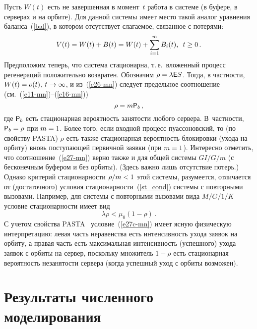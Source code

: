 \begin{multicols}{2}
\noindent
Пусть    $W(t)$
 есть не завершенная  в момент~$t$ работа в системе (в буфере, в серверах  и на
 орбите). Для данной  сис\-те\-мы имеет место такой аналог уравнения баланса~(\ref{bal}), 
 в котором отсутствует слагаемое, связанное с потерями:
\begin{equation}
V(t)=W(t)+B(t)=W(t)+\sum\limits_{i=1}^mB_i(t),\enskip t\ge0\,.
\label{e26-mn}
\end{equation}
Предположим теперь, что система стационарна, т.\,е.\ вложенный процесс
регенераций положительно возвратен. Обозначим $\rho\hm=\lambda\e S$.
Тогда, в част\-ности, $W(t)\hm=o(t)$, $t\hm\to \infty$, и из~(\ref{e26-mn})
следует  предельное соотношение (см.~(\ref{e11-mn})--(\ref{e16-mn}))
\begin{equation}
\rho= m {\sf P}_b\,,
\label{e27-mn}
\end{equation}
где ${\sf P}_b$ есть стационарная вероятность занятости любого сервера. В~част\-ности, $\p_b\hm=\rho$ 
при $m\hm =1$. Более того, если входной процесс
пуассоновский, то (по свойству PASTA)  $\rho$ есть  также
стационарная вероятность  блокировки (ухода на орбиту) вновь
поступающей первичной заявки (при $m\hm=1$).  Интересно отметить, что
соотношение~(\ref{e27-mn}) верно также и для общей сис\-те\-мы $GI/G/m$  (с
бесконечным буфером и без орбиты). (Здесь важно лишь отсутствие
потерь.) Однако критерий  стационарности $\rho/m\hm<1$ этой сис\-те\-мы,
разумеется, отличается от (достаточного) условия стационарности~(\ref{st_cond}) сис\-те\-мы 
с повторными вызовами.  Например, для
системы с повторными вызовами вида $M/G/1/K$ условие  стационарности
имеет вид
\begin{equation}
\lambda \rho<\mu_0\left(1-\rho\right)\,. 
\label{e27c-mn}
\end{equation}
С учетом свойства PASTA~\cite{Asmus} условие~(\ref{e27c-mn}) имеет
ясную физическую интерпретацию: левая часть неравенства есть
интенсивность ухода заявок на орбиту, а правая часть есть
максимальная интенсивность (успешного) ухода заявок с орбиты на
сервер, поскольку множитель $1-\rho$ есть стационарная вероятность
незанятости сервера (когда  успешный уход с орбиты возможен).






\section{Результаты численного  моделирования} 


\end{multicols}
